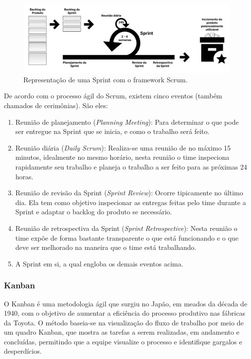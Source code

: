 \begin{figure}[h]
\centering
  \includegraphics[width=\columnwidth]{images/scrum.pdf}
  \caption{Representação de uma Sprint com o framework Scrum.}
  \label{fig:scrum}
\end{figure}

De acordo com o processo ágil do Scrum, existem cinco eventos (também chamados de cerimônias). São eles:

\begin{enumerate}
    \item Reunião de planejamento (\textit{Planning Meeting}): Para determinar o que pode ser entregue na Sprint que se inicia, e como o trabalho será feito.
    \item Reunião diária (\textit{Daily Scrum}): Realiza-se uma reunião de no máximo 15 minutos, idealmente no mesmo horário, nesta reunião o time inspeciona rapidamente seu trabalho e planeja o trabalho a ser feito para as próximas 24 horas.
    \item Reunião de revisão da Sprint (\textit{Sprint Review}): Ocorre tipicamente no último dia. Ela tem como objetivo inspecionar as entregas feitas pelo time durante a Sprint e adaptar o backlog do produto se necessário.
    \item Reunião de retrospectiva da Sprint (\textit{Sprint Retrospective}): Nesta reunião o time expõe de forma bastante transparente o que está funcionando e o que deve ser melhorado na maneira que o time está trabalhando.
    \item A Sprint em si, a qual engloba os demais eventos acima.
\end{enumerate}

\subsubsection{Kanban}\label{sssec:kanban}
O Kanban é uma metodologia ágil que surgiu no Japão, em meados da década de 1940, com o objetivo de aumentar a eficiência do processo produtivo nas fábricas da Toyota. O método baseia-se na visualização do fluxo de trabalho por meio de um quadro Kanban, que mostra as tarefas a serem realizadas, em andamento e concluídas, permitindo que a equipe visualize o processo e identifique gargalos e desperdícios. 

